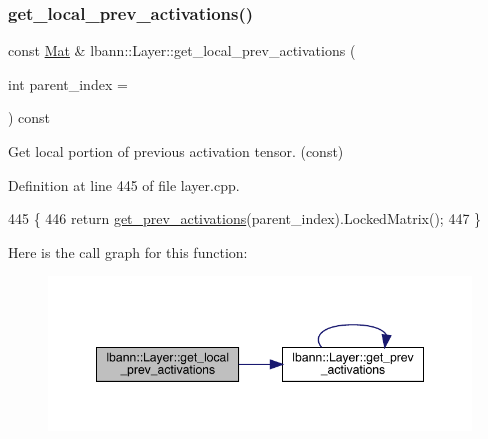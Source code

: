 \mbox{\label{classlbann_1_1Layer_ab0f7b4d0fdb06004dfde5358781eeece}} 
\subsubsection{\texorpdfstring{get\+\_\+local\+\_\+prev\+\_\+activations()}{get\_local\_prev\_activations()}\hspace{0.1cm}{\footnotesize\ttfamily [2/2]}}
{\footnotesize\ttfamily const \hyperlink{base_8hpp_a68f11fdc31b62516cb310831bbe54d73}{Mat} \& lbann\+::\+Layer\+::get\+\_\+local\+\_\+prev\+\_\+activations (\begin{DoxyParamCaption}\item[{int}]{parent\+\_\+index = {} }\end{DoxyParamCaption}) const}

Get local portion of previous activation tensor. (const) 

Definition at line 445 of file layer.\+cpp.


\begin{DoxyCode}
445                                                                    \{
446   \textcolor{keywordflow}{return} \hyperlink{classlbann_1_1Layer_a45853df73a2e72bfaa774665a0f37ed7}{get\_prev\_activations}(parent\_index).LockedMatrix();
447 \}
\end{DoxyCode}
Here is the call graph for this function\+:\nopagebreak
\begin{figure}[H]
\begin{center}
\leavevmode
\includegraphics[width=348pt]{classlbann_1_1Layer_ab0f7b4d0fdb06004dfde5358781eeece_cgraph}
\end{center}
\end{figure}
\mbox{\label{classlbann_1_1Layer_a82827edc5e869960144f3ccb2172bfcd}} 

